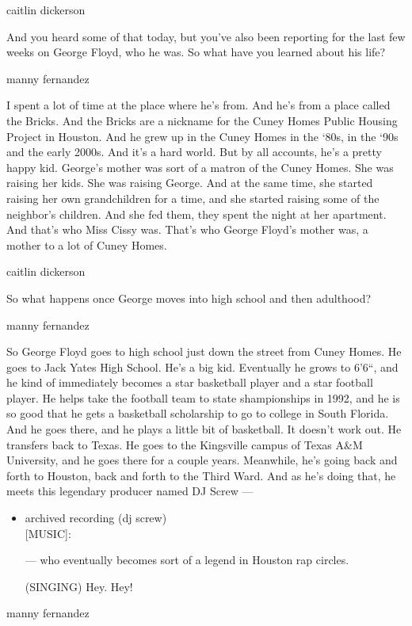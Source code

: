caitlin dickerson

And you heard some of that today, but you've also been reporting for the
last few weeks on George Floyd, who he was. So what have you learned
about his life?

manny fernandez

I spent a lot of time at the place where he's from. And he's from a
place called the Bricks. And the Bricks are a nickname for the Cuney
Homes Public Housing Project in Houston. And he grew up in the Cuney
Homes in the `80s, in the `90s and the early 2000s. And it's a hard
world. But by all accounts, he's a pretty happy kid. George's mother was
sort of a matron of the Cuney Homes. She was raising her kids. She was
raising George. And at the same time, she started raising her own
grandchildren for a time, and she started raising some of the neighbor's
children. And she fed them, they spent the night at her apartment. And
that's who Miss Cissy was. That's who George Floyd's mother was, a
mother to a lot of Cuney Homes.

caitlin dickerson

So what happens once George moves into high school and then adulthood?

manny fernandez

So George Floyd goes to high school just down the street from Cuney
Homes. He goes to Jack Yates High School. He's a big kid. Eventually he
grows to 6'6``, and he kind of immediately becomes a star basketball
player and a star football player. He helps take the football team to
state shampionships in 1992, and he is so good that he gets a basketball
scholarship to go to college in South Florida. And he goes there, and he
plays a little bit of basketball. It doesn't work out. He transfers back
to Texas. He goes to the Kingsville campus of Texas A\&M University, and
he goes there for a couple years. Meanwhile, he's going back and forth
to Houston, back and forth to the Third Ward. And as he's doing that, he
meets this legendary producer named DJ Screw ---

\begin{itemize}
\item
  archived recording (dj screw)\\
  {[}MUSIC{]}:

  --- who eventually becomes sort of a legend in Houston rap circles.

  (SINGING) Hey. Hey!
\end{itemize}

manny fernandez

